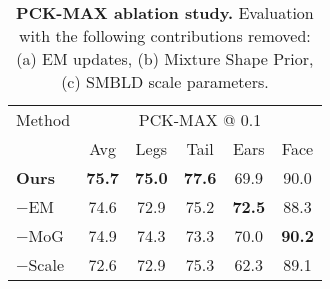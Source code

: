\begin{table}[!htbp]
    \begin{tabular}{@{}lccccc@{}}
    \toprule
    \multicolumn{1}{l}{Method} & 
    \multicolumn{5}{c}{PCK-MAX @ 0.1} \\
    \multicolumn{1}{c}{} &
    \multicolumn{1}{c}{Avg} &
    \multicolumn{1}{c}{Legs} &
    \multicolumn{1}{c}{Tail} &
    \multicolumn{1}{c}{Ears} &
    \multicolumn{1}{c}{Face} \\
    \midrule
    \textbf{Ours} & \textbf{75.7} & \textbf{75.0} & \textbf{77.6} & 69.9 & 90.0 \\
    $-$EM & 74.6 & 72.9 & 75.2 & \textbf{72.5} & 88.3 \\
    $-$MoG & 74.9 & 74.3 & 73.3 & 70.0 & \textbf{90.2} \\ 
    $-$Scale & 72.6 & 72.9 & 75.3 & 62.3 & 89.1 \\
    \bottomrule 
    \end{tabular}
    \caption{\label{tab:ablation}\textbf{PCK-MAX ablation study.} Evaluation with the following contributions removed: (a) EM updates, (b) Mixture Shape Prior, (c) SMBLD scale parameters.}
\end{table}
